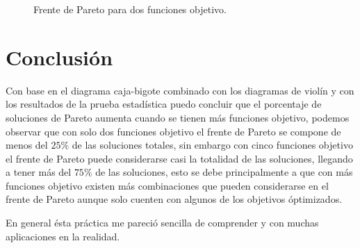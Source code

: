 \documentclass{article}
\begin{document}
\begin{figure}[h!]
\centering
{}
\caption{Frente de Pareto para dos funciones objetivo.} 
\label{f2}
\end{figure}

\newpage
\section{Conclusi\'{o}n}
Con base en el diagrama caja-bigote combinado con los diagramas de violín y con los resultados de la prueba estadística puedo concluir que el porcentaje de soluciones de Pareto aumenta cuando se tienen más funciones objetivo, podemos observar que con solo dos funciones objetivo el frente de Pareto se compone de menos del $25\%$ de las soluciones totales, sin embargo con cinco funciones objetivo el frente de Pareto puede considerarse casi la totalidad de las soluciones, llegando a tener más del $75\%$ de las soluciones, esto se debe principalmente a que con más funciones objetivo existen más combinaciones que pueden considerarse en el frente de Pareto aunque solo cuenten con algunos de los objetivos óptimizados.
\smallskip

En general ésta práctica me pareció sencilla de comprender y con muchas aplicaciones en la realidad.
\newpage



\end{document}
